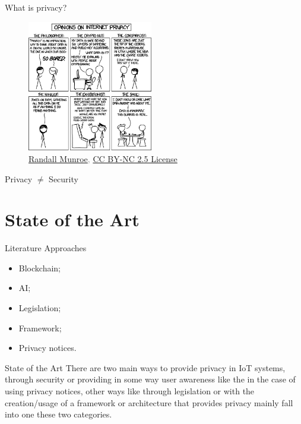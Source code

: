 \documentclass[xcolor={svgnames},compress,aspectratio=169]{beamer}
\begin{document}
\begin{frame}
    \begin{multicols}{2}
        \centering
        {\footnotesize What is privacy?}
        \begin{figure}
            \centering\includegraphics[width=155pt]{assets/images/privacy_opinions.png}\\
            \textcolor{gray}{{\tiny \textcopyright \href{https://xkcd.com/1269/}{Randall Munroe}, \href{https://creativecommons.org/licenses/by-nc/2.5/}{CC BY-NC 2.5 License}}}
        \end{figure}

        \columnbreak
        \centering
        \vspace*{\fill}
        Privacy $\ne$ Security
        \vspace*{\fill}
    \end{multicols}
\end{frame}


\section{State of the Art}

\begin{frame}{Literature Approaches}
    \begin{itemize}
        \item Blockchain;
        \item AI;
        \item Legislation;
        \item Framework;
        \item Privacy notices.
    \end{itemize}
\end{frame}


\begin{frame}{State of the Art}
    There are two main ways to provide privacy in IoT systems, through security
    or providing in some way user awareness like the in the case of using privacy
    notices, other ways like through legislation or with the
    creation/usage of a framework or architecture that provides privacy mainly
    fall into one these two categories.
\end{frame}
\end{document}
